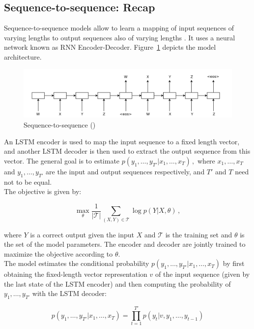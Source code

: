\documentclass[12pt]{article}\pagestyle{myheadings}
\newcommand{\T}{\mathcal{T}}
\begin{document}
\subsection{Sequence-to-sequence: Recap} 
Sequence-to-sequence models allow to learn a mapping of input sequences of varying lengths to output sequences also of varying lengths \citep{SutskeverVL14}. It uses a neural network known as RNN Encoder-Decoder. Figure~\ref{fig:seq2seq} depicts the model architecture. 
\begin{figure}[ht]
\centering
\includegraphics[width=1.0\linewidth]{figures/seq2seq.png}
\caption{\label{fig:seq2seq}Sequence-to-sequence (\citet{SutskeverVL14})}
\end{figure}
An LSTM encoder is used to map the input sequence to a fixed length vector, and another LSTM decoder is then used to extract the output sequence from this vector. The general goal is to estimate 
$
p(y_1,\ldots,y_{T'} | x_1, \ldots, x_T)\,,
$
where $x_1, \ldots, x_T$ and  $y_1,\ldots,y_{T'}$ are the input and output sequences respectively, and $T'$ and $T$ need not to be equal. 
\\

The objective is given by:

\begin{equation}
\max_{\theta} \frac{1}{|\T|} \sum_{(X,Y) \in \T} \log p(Y|X,\theta) \,,
\label{eq:seq2seq_obj}
\end{equation}

where $Y$ is a correct output given the input $X$ and $\T$ is the training set and $\theta$ is the set of the model parameters. 
The encoder and decoder are jointly trained to maximize the objective according to $\theta$.
\\

The model estimates the conditional probability $p(y_1,\ldots,y_{T'} | x_1, \ldots, x_T)$ by first obtaining the fixed-length vector representation $v$ of the input sequence (given by the last state of the LSTM encoder) and then computing the probability of $y_1,\ldots,y_{T'} $ with the LSTM decoder: 

\begin{equation}
p(y_1,\ldots,y_{T'} | x_1, \ldots, x_T) = \prod_{t=1}^{T'} p(y_t|v, y_1,\ldots,y_{t-1})
\end{equation}
\end{document}
